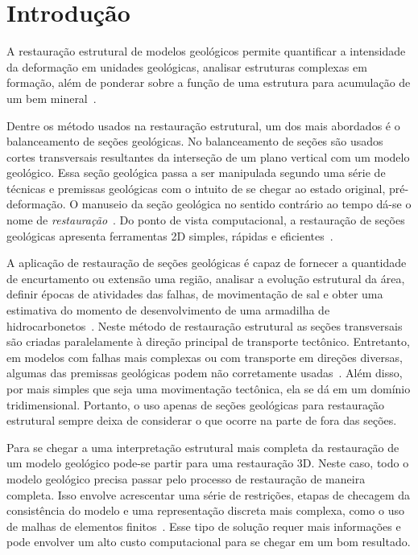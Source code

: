 
\chapter{Introdução}

A restauração estrutural de modelos geológicos permite quantificar a intensidade da deformação em unidades geológicas, analisar estruturas complexas em formação, além de ponderar sobre a função de uma estrutura para acumulação de um bem mineral~\cite{GarciaTese}.

Dentre os método usados na restauração estrutural, um dos mais abordados é o balanceamento de seções geológicas. No balanceamento de seções são usados cortes transversais resultantes da interseção de um plano vertical com um modelo geológico. Essa seção geológica passa a ser manipulada segundo uma série de técnicas e premissas geológicas com o intuito de se chegar ao estado original, pré-deformação. O manuseio da seção geológica no sentido contrário ao tempo dá-se o nome de \emph{restauração}~\cite{Fossen}. Do ponto de vista computacional, a restauração de seções geológicas apresenta ferramentas 2D simples, rápidas e eficientes~\cite{GarciaTese}.

A aplicação de restauração de seções geológicas é capaz de fornecer a quantidade de encurtamento ou extensão uma região, analisar a evolução estrutural da área, definir épocas de atividades das falhas, de movimentação de sal e obter uma estimativa do momento de desenvolvimento de uma armadilha de hidrocarbonetos~\cite{DURANDRIARD-3D, Guedes}. Neste método de restauração estrutural as seções transversais são criadas paralelamente à direção principal de transporte tectônico. Entretanto, em modelos com falhas mais complexas ou com transporte em direções diversas, algumas das premissas geológicas podem não corretamente usadas~\cite{GarciaTese}. Além disso, por mais simples que seja uma movimentação tectônica, ela se dá em um domínio tridimensional. Portanto, o uso apenas de seções geológicas para restauração estrutural sempre deixa de considerar o que ocorre na parte de fora das seções.

Para se chegar a uma interpretação estrutural mais completa da restauração de um modelo geológico pode-se partir para uma restauração 3D. Neste caso, todo o modelo geológico precisa passar pelo processo de restauração de maneira completa. Isso envolve acrescentar uma série de restrições, etapas de checagem da consistência do modelo e uma representação discreta mais complexa, como o uso de malhas de elementos finitos~\cite{DURANDRIARD2010441}. Esse tipo de solução requer mais informações e pode envolver um alto custo computacional para se chegar em um bom resultado.

